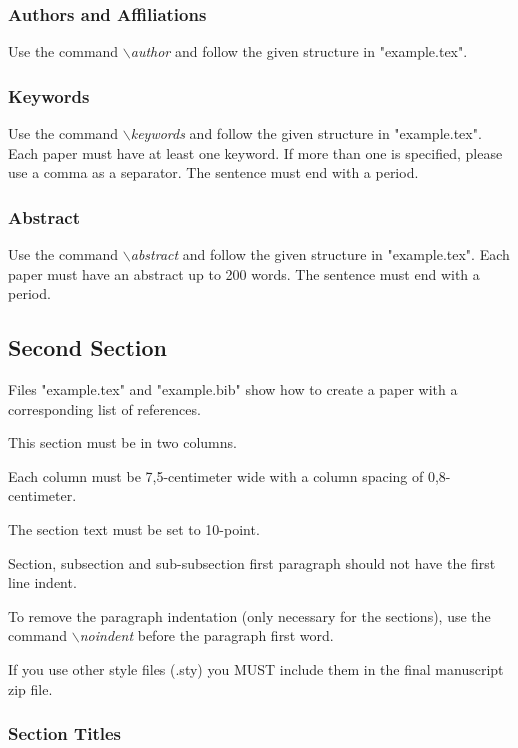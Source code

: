 \documentclass[a4paper,twoside]{article}
\begin{document}
\subsubsection{Authors and Affiliations}

Use the command \textit{$\backslash$author} and follow the given structure in "example.tex".

\subsubsection{Keywords}

Use the command \textit{$\backslash$keywords} and follow the given structure in "example.tex". Each paper must have at least one keyword. If more than one is specified, please use a comma as a separator. The sentence must end with a period.

\subsubsection{Abstract}

Use the command \textit{$\backslash$abstract} and follow the given structure in "example.tex".
Each paper must have an abstract up to 200 words. The sentence
must end with a period.

\subsection{Second Section}

Files "example.tex" and "example.bib" show how to create a paper
with a corresponding list of references.

This section must be in two columns.

Each column must be 7,5-centimeter wide with a column spacing
of 0,8-centimeter.

The section text must be set to 10-point.

Section, subsection and sub-subsection first paragraph should not
have the first line indent.

To remove the paragraph indentation (only necessary for the
sections), use the command \textit{$\backslash$noindent} before the
paragraph first word.

If you use other style files (.sty) you MUST include them in the
final manuscript zip file.

\subsubsection{Section Titles}
\end{document}
